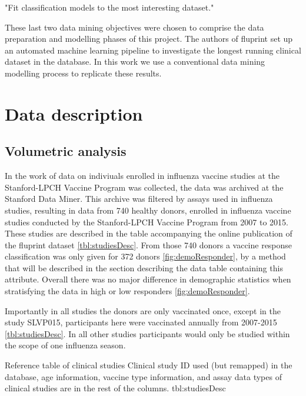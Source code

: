 \begin{displayquote}
"Fit classification models to the most interesting dataset."
\end{displayquote}

These last two data mining objectives were chosen to comprise the data
preparation and modelling phases of this project. The authors of fluprint set
up an automated machine learning pipeline to investigate the longest running
clinical dataset in the database. In this work we use a conventional data
mining modelling process to replicate these results.

\section{Data description}

\subsection{Volumetric analysis}

In the work of \cite{tomicFluPRINTDatasetMultidimensional2019} data on
indiviuals enrolled in influenza vaccine studies at the Stanford-LPCH Vaccine
Program was collected, the data was archived at the Stanford Data Miner. This
archive was filtered by assays used in influenza studies, resulting in data
from 740 healthy donors, enrolled in influenza vaccine studies conducted by the
Stanford-LPCH Vaccine Program from 2007 to 2015. These studies are described in
the table accompanying the online publication of the fluprint dataset
\autoref{tbl:studiesDesc}.  From those 740 donors a vaccine response
classification was only given for 372 donors \autoref{fig:demoResponder}, by a
method that will be described in the section describing the data table
containing this attribute. Overall there was no major difference in demographic
statistics when stratisfying the data in high or low responders
\autoref{fig:demoResponder}.

Importantly in all studies the donors are only vaccinated once, except in the
study SLVP015, participants here were vaccinated annually from 2007-2015
\autoref{tbl:studiesDesc}. In all other studies participants would only be
studied within the scope of one influenza season.

{Reference table of clinical studies}
{Clinical study ID used (but remapped) in the database, age information,
vaccine type information, and assay data types of clinical studies are in the
rest of the columns.}
{tbl:studiesDesc}


